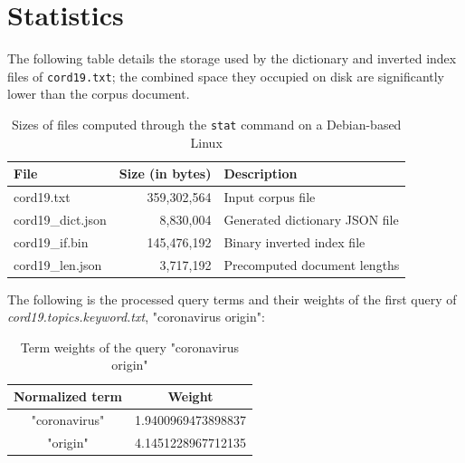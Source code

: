 \documentclass[11pt]{article}
\begin{document}
\section{Statistics}
The following table details the storage used by the dictionary and inverted index files of \texttt{cord19.txt}; the combined space they occupied on disk are significantly lower than the corpus document.

\begin{table}[!ht]
    \caption{Sizes of files computed through the \texttt{stat} command on a Debian-based Linux}
    \begin{center}

        \begin{tabular}{| l | r | l |}
        \hline
        \textbf{File} & \textbf{Size (in bytes)} & \textbf{Description} \\
        \hline
        cord19.txt & 359,302,564 & Input corpus file
        \\ \hline
        cord19\_dict.json & 8,830,004 & Generated dictionary JSON file
        \\ \hline
        cord19\_if.bin & 145,476,192 & Binary inverted index file
        \\ \hline
        cord19\_len.json & 3,717,192 & Precomputed document lengths
        \\ \hline
        \end{tabular}

    \end{center}

\end{table}

The following is the processed query terms and their weights of the first query of \textit{cord19.topics.keyword.txt}, "coronavirus origin":


\begin{table}[!ht]
    \caption{Term weights of the query "coronavirus origin"}
    \begin{center}

        \begin{tabular}{| c | c |}
        \hline
        \textbf{Normalized term} & \textbf{Weight}
        \\ \hline
        "coronavirus" & 1.9400969473898837
        \\ \hline
        "origin" & 4.1451228967712135
        \\ \hline
        \end{tabular}

    \end{center}

\end{table}
\end{document}
